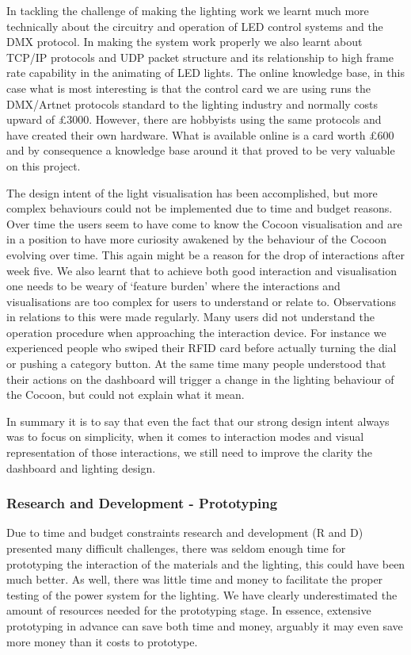 In tackling the challenge of making the lighting work we learnt much more technically about the circuitry and operation of LED control systems and the DMX protocol. In making the system work properly we also learnt about TCP/IP protocols and UDP packet structure and its relationship to high frame rate capability in the animating of LED lights. The online knowledge base, in this case what is most interesting is that the control card we are using runs the DMX/Artnet protocols standard to the lighting industry and normally costs upward of £3000. However, there are hobbyists using the same protocols and have created their own hardware. What is available online is a card worth £600 and by consequence a knowledge base around it that proved to be very valuable on this project.

The design intent of the light visualisation has been accomplished, but more complex behaviours could not be implemented due to time and budget reasons. Over time the users seem to have come to know the Cocoon visualisation and are in a position to have more curiosity awakened by the behaviour of the Cocoon evolving over time. This again might be a reason for the drop of interactions after week five. We also learnt that to achieve both good interaction and visualisation one needs to be weary of ‘feature burden’ where the interactions and visualisations are too complex for users to understand or relate to. Observations in relations to this were made regularly. Many users did not understand the operation procedure when approaching the interaction device. For instance we experienced people who swiped their RFID card before actually turning the dial or pushing a category button. At the same time many people understood that their actions on the dashboard will trigger a change in the lighting behaviour of the Cocoon, but could not explain what it mean. 

In summary it is to say that even the fact that our strong design intent always was to focus on simplicity, when it comes to interaction modes and visual representation of those interactions, we still need to improve the clarity the dashboard and lighting design.

\subsubsection*{Research and Development - Prototyping}

Due to time and budget constraints research and development (R and D) presented many difficult challenges, there was seldom enough time for prototyping the interaction of the materials and the lighting, this could have been much better. As well, there was little time and money to facilitate the proper testing of the power system for the lighting. We have clearly underestimated the amount of resources needed for the prototyping stage. 
In essence, extensive prototyping in advance can save both time and money, arguably it may even save more money than it costs to prototype. 

